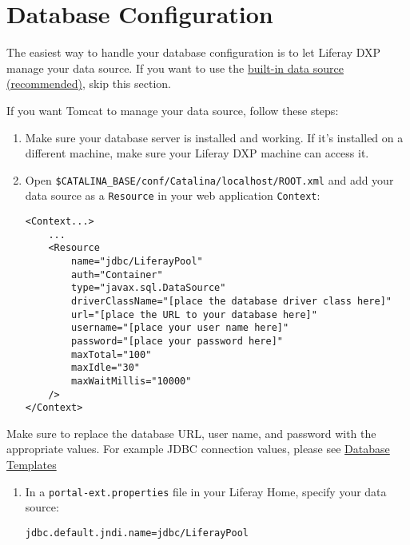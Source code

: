 \section{Database Configuration}\label{database-configuration}

The easiest way to handle your database configuration is to let Liferay
DXP manage your data source. If you want to use the
\href{/docs/7-2/deploy/-/knowledge_base/d/preparing-for-install\#using-the-built-in-data-source}{built-in
data source (recommended)}, skip this section.

If you want Tomcat to manage your data source, follow these steps:

\begin{enumerate}
\def\labelenumi{\arabic{enumi}.}
\item
  Make sure your database server is installed and working. If it's
  installed on a different machine, make sure your Liferay DXP machine
  can access it.
\item
  Open \texttt{\$CATALINA\_BASE/conf/Catalina/localhost/ROOT.xml} and
  add your data source as a \texttt{Resource} in your web application
  \texttt{Context}:

\begin{verbatim}
<Context...>
    ...
    <Resource
        name="jdbc/LiferayPool"
        auth="Container"
        type="javax.sql.DataSource"
        driverClassName="[place the database driver class here]"
        url="[place the URL to your database here]"
        username="[place your user name here]"
        password="[place your password here]"
        maxTotal="100"
        maxIdle="30"
        maxWaitMillis="10000"
    />
</Context>
\end{verbatim}
\end{enumerate}

Make sure to replace the database URL, user name, and password with the
appropriate values. For example JDBC connection values, please see
\href{/docs/7-2/deploy/-/knowledge_base/d/database-templates}{Database
Templates}

\begin{enumerate}
\def\labelenumi{\arabic{enumi}.}
\setcounter{enumi}{2}
\item
  In a \texttt{portal-ext.properties} file in your Liferay Home, specify
  your data source:

\begin{verbatim}
jdbc.default.jndi.name=jdbc/LiferayPool
\end{verbatim}
\end{enumerate}

